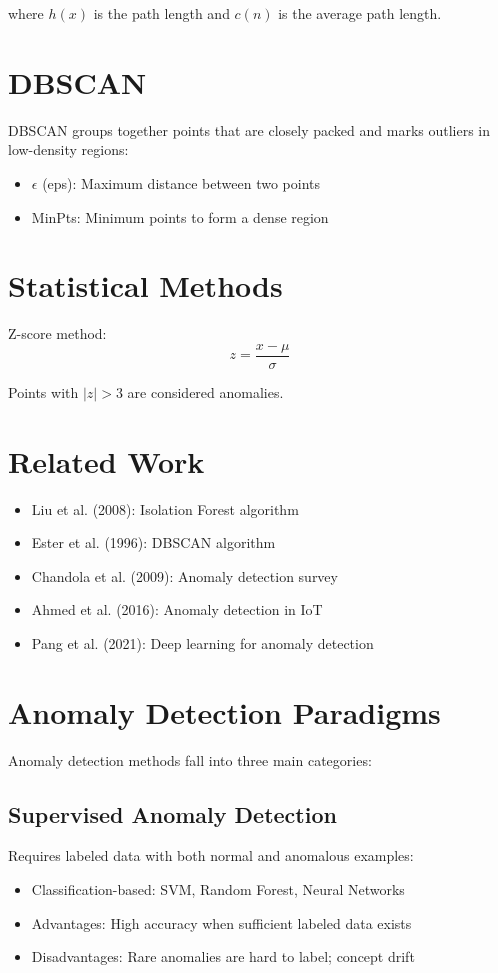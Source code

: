 \documentclass[12pt,a4paper]{report}
\begin{document}
where $h(x)$ is the path length and $c(n)$ is the average path length.

\section{DBSCAN}
DBSCAN groups together points that are closely packed and marks outliers in low-density regions:

\begin{itemize}
    \item $\epsilon$ (eps): Maximum distance between two points
    \item MinPts: Minimum points to form a dense region
\end{itemize}

\section{Statistical Methods}
Z-score method:
\begin{equation}
z = \frac{x - \mu}{\sigma}
\end{equation}

Points with $|z| > 3$ are considered anomalies.

\section{Related Work}
\begin{itemize}
    \item Liu et al. (2008): Isolation Forest algorithm
    \item Ester et al. (1996): DBSCAN algorithm
    \item Chandola et al. (2009): Anomaly detection survey
    \item Ahmed et al. (2016): Anomaly detection in IoT
    \item Pang et al. (2021): Deep learning for anomaly detection
\end{itemize}

\section{Anomaly Detection Paradigms}
\label{sec:paradigms}
Anomaly detection methods fall into three main categories:

\subsection{Supervised Anomaly Detection}
Requires labeled data with both normal and anomalous examples:
\begin{itemize}
    \item Classification-based: SVM, Random Forest, Neural Networks
    \item Advantages: High accuracy when sufficient labeled data exists
    \item Disadvantages: Rare anomalies are hard to label; concept drift
\end{itemize}
\end{document}
